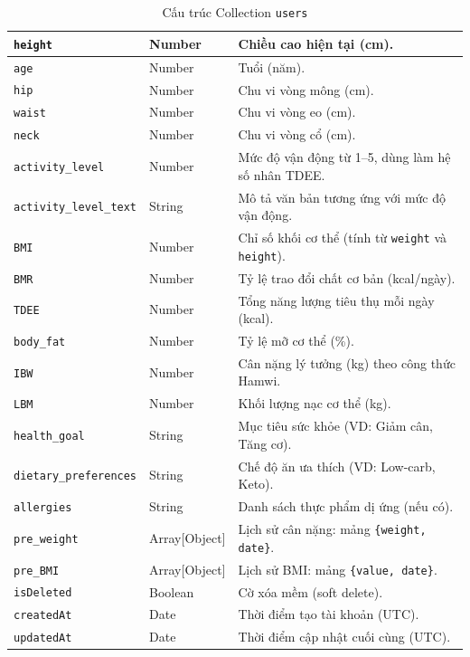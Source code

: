 \begin{table}[H]
\begin{tabularx}{\textwidth}{|p{4.0cm}|p{2.6cm}|X|}
\texttt{height}                & Number            & Chiều cao hiện tại (cm). \\ \hline
\rowcolor{dbrowalt}
\texttt{age}                   & Number            & Tuổi (năm). \\ \hline
\texttt{hip}                   & Number            & Chu vi vòng mông (cm). \\ \hline
\rowcolor{dbrowalt}
\texttt{waist}                 & Number            & Chu vi vòng eo (cm). \\ \hline
\texttt{neck}                  & Number            & Chu vi vòng cổ (cm). \\ \hline
\rowcolor{dbrowalt}
\texttt{activity\_level}       & Number            & Mức độ vận động từ 1–5, dùng làm hệ số nhân TDEE. \\ \hline
\texttt{activity\_level\_text} & String            & Mô tả văn bản tương ứng với mức độ vận động. \\ \hline
\rowcolor{dbrowalt}
\texttt{BMI}                   & Number            & Chỉ số khối cơ thể (tính từ \texttt{weight} và \texttt{height}). \\ \hline
\texttt{BMR}                   & Number            & Tỷ lệ trao đổi chất cơ bản (kcal/ngày). \\ \hline
\rowcolor{dbrowalt}
\texttt{TDEE}                  & Number            & Tổng năng lượng tiêu thụ mỗi ngày (kcal). \\ \hline
\texttt{body\_fat}             & Number            & Tỷ lệ mỡ cơ thể (\%). \\ \hline
\rowcolor{dbrowalt}
\texttt{IBW}                   & Number            & Cân nặng lý tưởng (kg) theo công thức Hamwi. \\ \hline
\texttt{LBM}                   & Number            & Khối lượng nạc cơ thể (kg). \\ \hline
\rowcolor{dbrowalt}
\texttt{health\_goal}          & String            & Mục tiêu sức khỏe (VD: Giảm cân, Tăng cơ). \\ \hline
\texttt{dietary\_preferences}  & String            & Chế độ ăn ưa thích (VD: Low-carb, Keto). \\ \hline
\rowcolor{dbrowalt}
\texttt{allergies}             & String            & Danh sách thực phẩm dị ứng (nếu có). \\ \hline
\texttt{pre\_weight}           & Array[Object]     & Lịch sử cân nặng: mảng \texttt{\{weight, date\}}. \\ \hline
\rowcolor{dbrowalt}
\texttt{pre\_BMI}              & Array[Object]     & Lịch sử BMI: mảng \texttt{\{value, date\}}. \\ \hline
\texttt{isDeleted}             & Boolean           & Cờ xóa mềm (soft delete). \\ \hline
\rowcolor{dbrowalt}
\texttt{createdAt}             & Date              & Thời điểm tạo tài khoản (UTC). \\ \hline
\texttt{updatedAt}             & Date              & Thời điểm cập nhật cuối cùng (UTC). \\ \hline
\end{tabularx}
\caption{Cấu trúc Collection \texttt{users}}
\label{tab:col_users}
\end{table}

